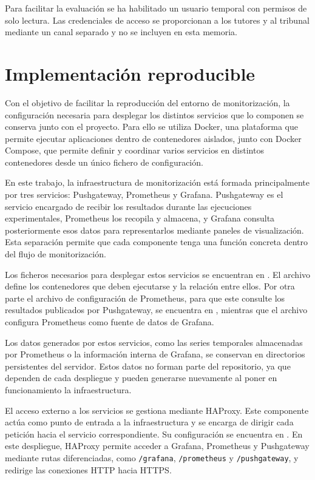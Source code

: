 Para facilitar la evaluación se ha habilitado un usuario temporal con permisos de solo lectura. Las credenciales de acceso se proporcionan a los tutores y al tribunal mediante un canal separado y no se incluyen en esta memoria.

\section{Implementación reproducible}

Con el objetivo de facilitar la reproducción del entorno de monitorización, la configuración necesaria para desplegar los distintos servicios que lo componen se conserva junto con el proyecto. Para ello se utiliza Docker, una plataforma que permite ejecutar aplicaciones dentro de contenedores aislados, junto con Docker Compose, que permite definir y coordinar varios servicios en distintos contenedores desde un único fichero de configuración.

En este trabajo, la infraestructura de monitorización está formada principalmente por tres servicios: Pushgateway, Prometheus y Grafana. Pushgateway es el servicio encargado de recibir los resultados durante las ejecuciones experimentales, Prometheus los recopila y almacena, y Grafana consulta posteriormente esos datos para representarlos mediante paneles de visualización. Esta separación permite que cada componente tenga una función concreta dentro del flujo de monitorización.

Los ficheros necesarios para desplegar estos servicios se encuentran en . El archivo  define los contenedores que deben ejecutarse y la relación entre ellos. Por otra parte el archivo de configuración de Prometheus, para que este consulte los resultados publicados por Pushgateway, se encuentra en , mientras que el archivo  configura Prometheus como fuente de datos de Grafana.

Los datos generados por estos servicios, como las series temporales almacenadas por Prometheus o la información interna de Grafana, se conservan en directorios persistentes del servidor. Estos datos no forman parte del repositorio, ya que dependen de cada despliegue y pueden generarse nuevamente al poner en funcionamiento la infraestructura.

El acceso externo a los servicios se gestiona mediante HAProxy. Este componente actúa como punto de entrada a la infraestructura y se encarga de dirigir cada petición hacia el servicio correspondiente. Su configuración se encuentra en . En este despliegue, HAProxy permite acceder a Grafana, Prometheus y Pushgateway mediante rutas diferenciadas, como \texttt{/grafana}, \texttt{/prometheus} y \texttt{/pushgateway}, y redirige las conexiones HTTP hacia HTTPS.


